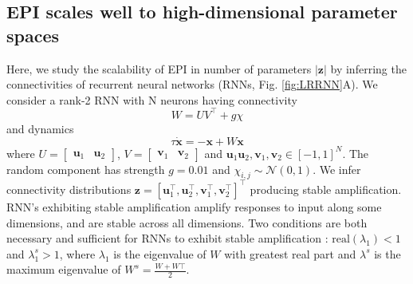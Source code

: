 \documentclass[11pt]{article}
\begin{document}
\subsection{EPI scales well to high-dimensional parameter spaces} \label{results_LRRNN}
Here, we study the scalability of EPI in number of parameters $|\mathbf{z}|$ by inferring the connectivities of recurrent neural networks (RNNs, Fig. \ref{fig:LRRNN}A). 
 We consider a rank-2 RNN with N neurons having connectivity
\begin{equation}
 W = UV^\top + g\chi
 \end{equation}
 and dynamics
 \begin{equation}
 \tau \dot{\mathbf{x}} = -\mathbf{x} + W\mathbf{x}
 \end{equation}
where $U = \begin{bmatrix} \mathbf{u}_1 & \mathbf{u}_2 \end{bmatrix}$, $V = \begin{bmatrix} \mathbf{v}_1 & \mathbf{v}_2 \end{bmatrix}$ and $\mathbf{u}_1 \mathbf{u}_2, \mathbf{v}_1, \mathbf{v}_2 \in \left[-1, 1 \right]^N$.  
The random component has strength $g=0.01$ and $\chi_{i,j} \sim \mathcal{N}(0, 1)$.  
We  infer connectivity distributions $\mathbf{z} = \left[\mathbf{u}_1^\top, \mathbf{u}_2^\top, \mathbf{v}_1^\top, \mathbf{v}_2^\top \right]^\top$   producing stable amplification.
RNN's exhibiting stable amplification amplify responses to input along some dimensions, and are stable across all dimensions.
Two conditions are both necessary and sufficient for RNNs to exhibit stable amplification \cite{bondanelli2020coding}:  $\text{real}(\lambda_1) < 1$ and
$\lambda^s_1 > 1$, where $\lambda_1$ is the eigenvalue of $W$ with greatest real part and $\lambda^s$ is the maximum eigenvalue of $W^s = \frac{W + W\top}{2}$.
\end{document}
